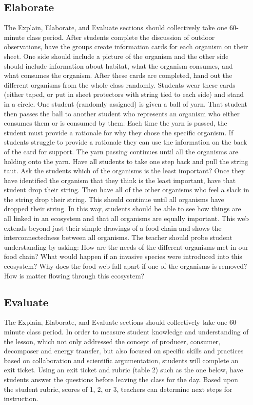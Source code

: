 \documentclass[11pt]{sig-alternate}
\begin{document}
\begin{large}
\subsection*{Elaborate}

The Explain, Elaborate, and Evaluate sections should collectively take one 60-minute class period. After students complete the discussion of outdoor observations, have the groups create information cards for each organism on their sheet. One side should include a picture of the organism and the other side should include information about habitat, what the organism consumes, and what consumes the organism. After these cards are completed, hand out the different organisms from the whole class randomly. Students wear these cards (either taped, or put in sheet protectors with string tied to each side) and stand in a circle. One student (randomly assigned) is given a ball of yarn. That student then passes the ball to another student who represents an organism who either consumes them or is consumed by them. Each time the yarn is passed, the student must provide a rationale for why they chose the specific organism. If students struggle to provide a rationale they can use the information on the back of the card for support. The yarn passing continues until all the organisms are holding onto the yarn. Have all students to take one step back and pull the string taut. Ask the students which of the organisms is the least important? Once they have identified the organism that they think is the least important, have that student drop their string. Then have all of the other organisms who feel a slack in the string drop their string. This should continue until all organisms have dropped their string. In this way, students should be able to see how things are all linked in an ecosystem and that all organisms are equally important. This web extends beyond just their simple drawings of a food chain and shows the interconnectedness between all organisms. The teacher should probe student understanding by asking: How are the needs of the different organisms met in our food chain? What would happen if an invasive species were introduced into this ecosystem? Why does the food web fall apart if one of the organisms is removed? How is matter flowing through this ecosystem?

\subsection*{Evaluate}

The Explain, Elaborate, and Evaluate sections should collectively take one 60-minute class period. In order to measure student knowledge and understanding of the lesson, which not only addressed the concept of producer, consumer, decomposer and energy transfer, but also focused on specific skills and practices based on collaboration and scientific argumentation, students will complete an exit ticket. Using an exit ticket and rubric (table 2) such as the one below, have students answer the questions before leaving the class for the day. Based upon the student rubric, scores of 1, 2, or 3, teachers can determine next steps for instruction.
 

\end{large}
\end{document}
